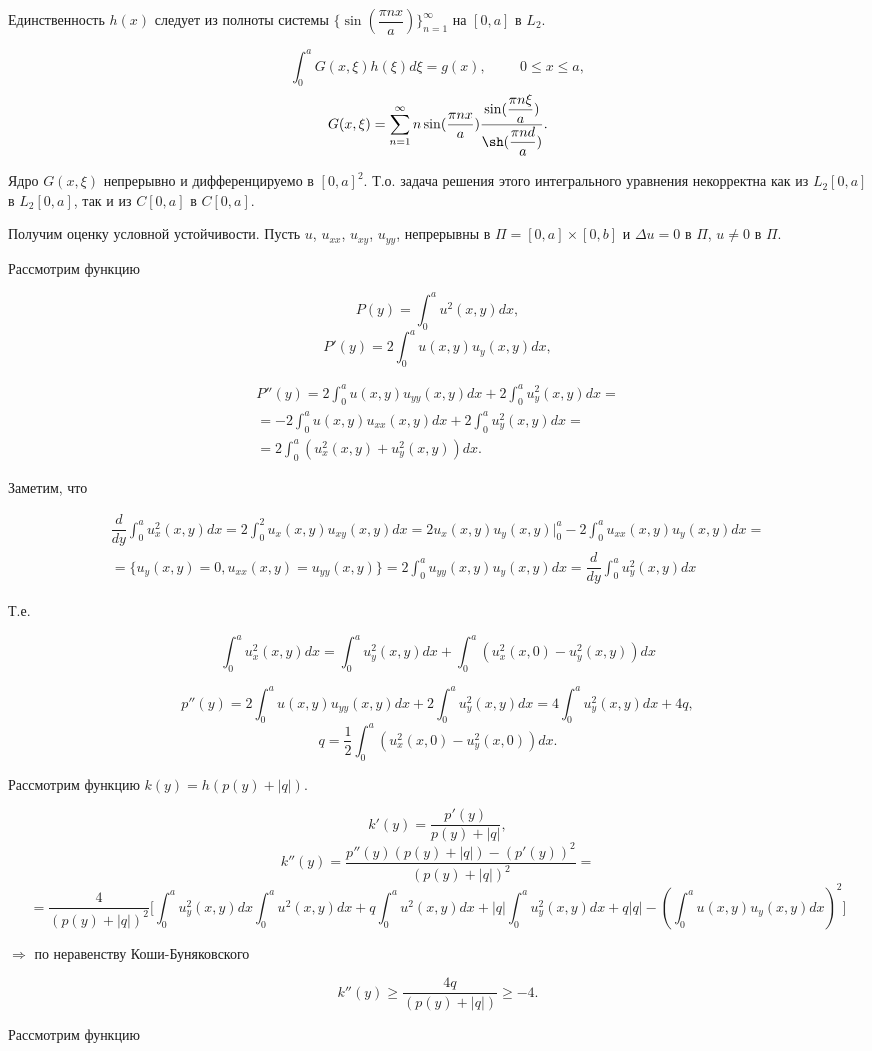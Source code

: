 \documentclass{article}
\begin{document}
Единственность $h(x)$ следует из полноты системы $\{\sin (\dfrac{\pi n x}{a})\}_{n=1}^{\infty}$ на $[0,a]$ в $L_2$.


\[
\int_0^a G(x,\xi) h(\xi) d \xi = g(x), \hspace{1cm} 0 \leqslant x \leqslant a,
\]
\[
G(x,\xi) =  \sum_{n=1}^{\infty} n \sin (\dfrac{\pi n x}{a})  \dfrac{\sin (\dfrac{\pi n \xi}{a})}{\sh (\dfrac{\pi n d}{a})}.
\]

Ядро $G(x,\xi)$ непрерывно и дифференцируемо в $[0,a]^2$. Т.о. задача решения этого интегрального уравнения некорректна как из $L_2[0,a]$ в $L_2[0,a]$, так и из $C[0,a]$ в $C[0,a]$.

Получим оценку условной устойчивости. Пусть $u$, $u_{xx}$, $u_{xy}$, $u_{yy}$, непрерывны в $\Pi = [0,a] \times [0,b]$ и $\Delta u = 0$ в $\Pi$, $u \ne 0$ в $\Pi$.

Рассмотрим функцию

\[
P(y) = \int_0^a u^2 (x,y) dx,
\]
\[
P'(y) = 2 \int_0^a u (x,y) u_y(x,y) dx,
\]

\begin{multline*}
P''(y) = 2 \int_0^a u (x,y) u_{yy}(x,y) dx + 2 \int_0^a u_y^2 (x,y) dx = \\
= -2 \int_0^a u (x,y) u_{xx}(x,y)dx + 2 \int_0^a u_y^2(x,y)dx = \\
=  2 \int_0^a (u_x^2(x,y) + u_y^2(x,y))dx.
\end{multline*}

Заметим, что

\begin{multline*}
\dfrac{d}{dy} \int_0^a u_x^2(x,y)dx =
 2 \int_0^2 u_x(x,y) u_{xy}(x,y) dx = 
 2 u_x(x,y) u_y(x,y) \bigg|_0^a - 2 \int_0^a u_{xx}(x,y) u_y(x,y) dx =\\
= \bigg\{ u_y(x,y) = 0, u_{xx}(x,y) = u_{yy}(x,y) \bigg\} =
 2 \int_0^a u_{yy}(x,y) u_y(x,y) dx = \dfrac{d}{dy} \int_0^a u_y^2(x,y)dx
\end{multline*}

Т.е.

\[
\int_0^a u_x^2(x,y)dx = \int_0^a u_y^2(x,y) dx + \int_0^a (u_x^2(x,0) - u_y^2(x,y)) dx
\]

\[
p''(y) = 2 \int_0^a u(x,y) u_{yy}(x,y)dx + 2 \int_0^a u_y^2(x,y) dx = 4 \int_0^a u_y^2(x,y) dx + 4q,
\]
\[
q = \dfrac{1}{2} \int_0^a (u_x^2(x,0) - u_y^2(x,0))dx.
\]

Рассмотрим функцию $k(y) = h(p(y) + |q|)$.

\[
k'(y) = \dfrac{p'(y)}{p(y) + |q|}, 
\]
\[
k''(y) = \dfrac{p''(y) (p(y) + |q|) - (p'(y))^2}{(p(y) + |q|)^2} = 
\]
\[
=\dfrac{4}{(p(y) + |q|)^2} \bigg[ \int_0^a u_y^2(x,y) dx \int_0^a u^2(x,y)dx + q \int_0^a u^2(x,y) dx + |q| \int_0^a u_y^2(x,y)dx + q |q| - (\int_0^a u(x,y) u _y(x,y)dx)^2 \bigg]
\]

$\Rightarrow $ по неравенству Коши-Буняковского

\[
k''(y) \geqslant \dfrac{4q}{(p(y) + |q|)} \geqslant -4.
\]

Рассмотрим функцию
\end{document}
